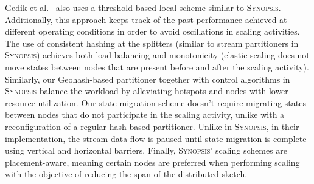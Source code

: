 Gedik et al.~\cite{schneider2009elastic} also uses a threshold-based local scheme similar to \textsc{Synopsis}. Additionally, this approach keeps track of the past performance achieved at different operating conditions in order to avoid oscillations in scaling activities.
The use of consistent hashing at the splitters (similar to stream partitioners in \textsc{Synopsis}) achieves both load balancing and monotonicity (elastic scaling does not move states between nodes that are present before and after the scaling activity).
Similarly, our Geohash-based partitioner together with control algorithms in \textsc{Synopsis} balance the workload by alleviating hotspots and nodes with lower resource utilization.
Our state migration scheme doesn't require migrating states between nodes that do not participate in the scaling activity, unlike with a reconfiguration of a regular hash-based partitioner.
Unlike in \textsc{Synopsis}, in their implementation, the stream data flow is paused until state migration is complete using vertical and horizontal barriers.
Finally, \textsc{Synopsis}' scaling schemes are placement-aware, meaning certain nodes are preferred when performing scaling with the objective of reducing the span of the distributed sketch.

